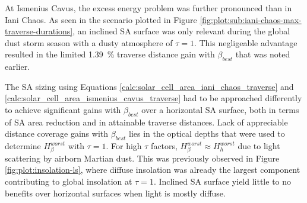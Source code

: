 At Ismenius Cavus, the excess energy problem was further pronounced than in Iani Chaos. As seen in the scenario plotted in Figure \ref{fig:plot:sub:iani-chaos-max-traverse-durations}, an inclined \ac{SA} surface was only relevant during the global dust storm season with a dusty atmosphere of $\tau = 1$. This negligeable advantage resulted in the limited \SI{1.39}{\percent} traverse distance gain with $\beta_{best}$ that was noted earlier.

The \ac{SA} sizing using Equations \ref{calc:solar_cell_area_iani_chaos_traverse} and \ref{calc:solar_cell_area_ismenius_cavus_traverse} had to be approached differently to achieve significant gains with $\beta_{best}$ over a horizontal \ac{SA} surface, both in terms of \ac{SA} area reduction and in attainable traverse distances. Lack of appreciable distance coverage gains with $\beta_{best}$ lies in the optical depths that were used to determine $H_{\beta}^{worst}$ with $\tau = 1$. For high $\tau$ factors, $H_{\beta}^{worst} \approx H_{h}^{worst}$ due to light scattering by airborn Martian dust. This was previously observed in Figure \ref{fig:plot:insolation-ls}, where diffuse insolation was already the largest component contributing to global insolation at $\tau = 1$. Inclined \ac{SA} surface yield little to no benefits over horizontal surfaces when light is mostly diffuse.

